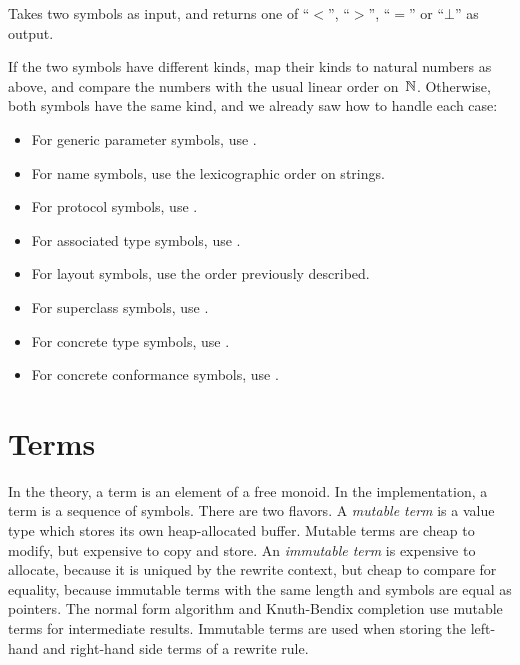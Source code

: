 \documentclass[../generics]{subfiles}
\begin{document}
\begin{algorithm}\label{symbol reduction order}
Takes two symbols as input, and returns one of ``$<$'', ``$>$'', ``$=$'' or ``$\bot$'' as output.

If the two symbols have different kinds, map their kinds to natural numbers as above, and compare the numbers with the usual linear order on~$\mathbb{N}$. Otherwise, both symbols have the same kind, and we already saw how to handle each case:
\begin{itemize}
\item For generic parameter symbols, use .
\item For name symbols, use the lexicographic order on strings.
\item For protocol symbols, use .
\item For associated type symbols, use .
\item For layout symbols, use the order previously described.
\item For superclass symbols, use .
\item For concrete type symbols, use .
\item For concrete conformance symbols, use .
\end{itemize}
\end{algorithm}

\section{Terms}\label{building terms}

In the theory, a term is an element of a free monoid. In the implementation, a term is a sequence of symbols. There are two flavors. A \emph{mutable term} is a value type which stores its own heap-allocated buffer. Mutable terms are cheap to modify, but expensive to copy and store. An \emph{immutable term} is expensive to allocate, because it is uniqued by the rewrite context, but cheap to compare for equality, because immutable terms with the same length and symbols are equal as pointers. The normal form algorithm and Knuth-Bendix completion use mutable terms for intermediate results. Immutable terms are used when storing the left-hand and right-hand side terms of a rewrite rule.
\end{document}

